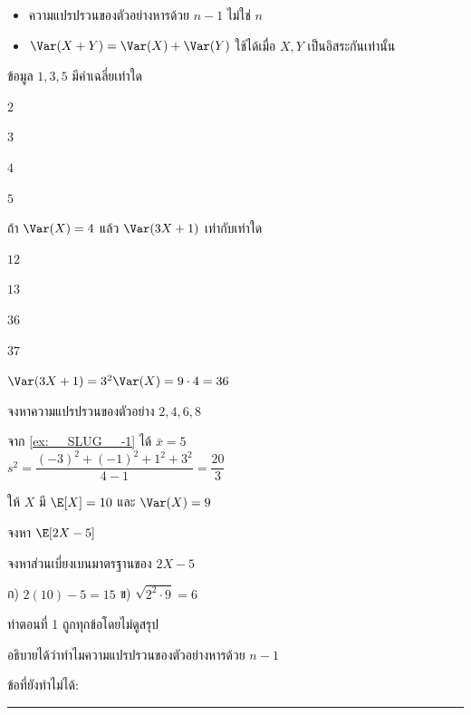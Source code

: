 \begin{formulabox}{\txtmistakes}
  \begin{itemize}[leftmargin=1.2em, itemsep=0.1em, topsep=0pt]
    \item ความแปรปรวนของตัวอย่างหารด้วย $n-1$ ไม่ใช่ $n$
    \item $\Var(X + Y) = \Var(X) + \Var(Y)$ ใช้ได้เมื่อ $X, Y$ เป็นอิสระกันเท่านั้น
  \end{itemize}
\end{formulabox}

\topichead{\txtpartmc}

\begin{exercises}
  \item ข้อมูล $1, 3, 5$ มีค่าเฉลี่ยเท่าใด 
  \begin{choices}[4]
    \item $2$
    \item \correct $3$
    \item $4$
    \item $5$
  \end{choices}

  \item ถ้า $\Var(X) = 4$ แล้ว $\Var(3X + 1)$ เท่ากับเท่าใด 
  \begin{choices}[4]
    \item $12$
    \item $13$
    \item \correct $36$
    \item $37$
  \end{choices}
  \begin{answer}
    $\Var(3X + 1) = 3^2 \Var(X) = 9 \cdot 4 = 36$
  \end{answer}
\end{exercises}

\topichead{\txtpartwritten}

\begin{exercises}[resume]
  \item จงหาความแปรปรวนของตัวอย่าง $2, 4, 6, 8$ 
  \workbox[4cm]
  \begin{answer}
    จาก \cref{ex:__SLUG__-1} ได้ $\bar{x} = 5$ \\
    $s^2 = \dfrac{(-3)^2 + (-1)^2 + 1^2 + 3^2}{4 - 1} = \dfrac{20}{3}$
  \end{answer}

  \item ให้ $X$ มี $\E[X] = 10$ และ $\Var(X) = 9$ 
  \begin{subq}
    \item จงหา $\E[2X - 5]$
    \item จงหาส่วนเบี่ยงเบนมาตรฐานของ $2X - 5$
  \end{subq}
  \workbox[4cm]
  \begin{answer}
    ก) $2(10) - 5 = 15$ \qquad ข) $\sqrt{2^2 \cdot 9} = 6$
  \end{answer}
\end{exercises}

\topichead{\txtselfcheck}
\begin{checklist}
  \item ทำตอนที่ 1 ถูกทุกข้อโดยไม่ดูสรุป
  \item อธิบายได้ว่าทำไมความแปรปรวนของตัวอย่างหารด้วย $n-1$
  \item ข้อที่ยังทำไม่ได้: \rule{0.5\linewidth}{0.4pt}
\end{checklist}
